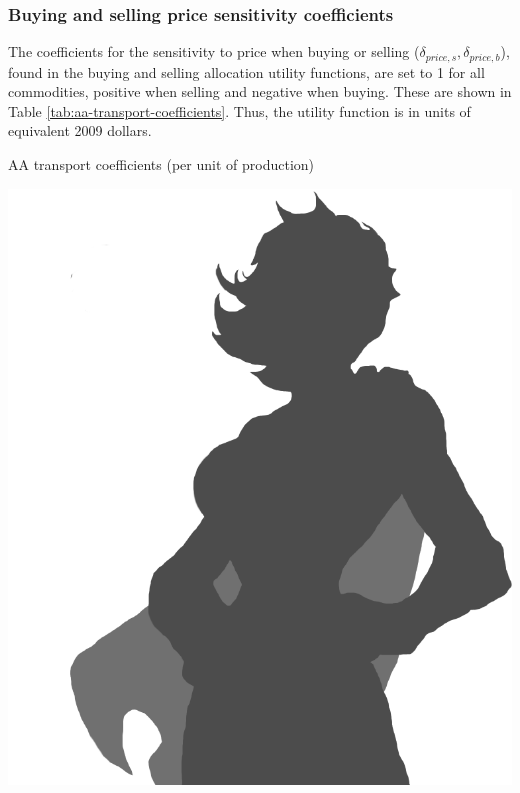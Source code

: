 \subsubsection{Buying and selling price sensitivity coefficients}

The coefficients for the sensitivity to price when buying or selling ($\delta_{price,s}, \delta_{price,b}$), found in the buying and selling allocation utility functions, are set to 1 for all commodities, positive when selling and negative when buying. These are shown in Table \ref{tab:aa-transport-coefficients}. Thus, the utility function is in units of equivalent 2009 dollars.

\begin{table}   %
\centering
\caption{AA transport coefficients (per unit of production)}
\label{tab:aa-transport-coefficients}
\includegraphics[scale=0.5]{graphics/placeholder-female-superhero-c}
\end{table}

